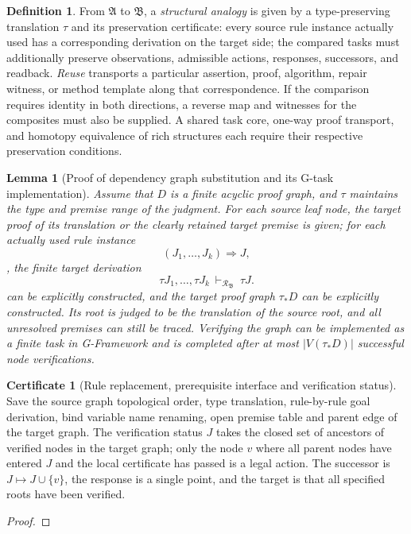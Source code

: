 \documentclass[11pt,a4paper]{article}
\theoremstyle{plain}
\newtheorem{lemma}[theorem]{Lemma}
\theoremstyle{definition}
\newtheorem{definition}[theorem]{Definition}
\newtheorem*{certificate}{Certificate}
\theoremstyle{remark}
\begin{document}
\begin{CJK*}
\begin{definition}
From $\mathfrak A$ to $\mathfrak B$, a \emph { structural analogy } is given by a type-preserving translation $\tau$ and its preservation certificate: every source rule instance actually used has a corresponding derivation on the target side; the compared tasks must additionally preserve observations, admissible actions, responses, successors, and readback. \emph { Reuse } transports a particular assertion, proof, algorithm, repair witness, or method template along that correspondence. If the comparison requires identity in both directions, a reverse map and witnesses for the composites must also be supplied. A shared task core, one-way proof transport, and homotopy equivalence of rich structures each require their respective preservation conditions.
\end{definition}

\begin{lemma}
[Proof of dependency graph substitution and its G-task implementation]\label{ar:dag-transport}
Assume that $D$ is a finite acyclic proof graph, and $\tau$ maintains the type and premise range of the judgment. For each source leaf node, the target proof of its translation or the clearly retained target premise is given; for each actually used rule instance \[
 (J_1,\ldots,J_k)\Longrightarrow J,
\], the finite target derivation \[
 \tau J_1,\ldots,\tau J_k\ \vdash_{\mathcal R_{\mathfrak B}}\ \tau J.
\] can be explicitly constructed, and the target proof graph $\tau_*D$ can be explicitly constructed. Its root is judged to be the translation of the source root, and all unresolved premises can still be traced. Verifying the graph can be implemented as a finite task in G-Framework and is completed after at most $|V(\tau_*D)|$ successful node verifications.\end{lemma}
\begin{certificate}
[Rule replacement, prerequisite interface and verification status]Save the source graph topological order, type translation, rule-by-rule goal derivation, bind variable name renaming, open premise table and parent edge of the target graph. The verification status $J$ takes the closed set of ancestors of verified nodes in the target graph; only the node $v$ where all parent nodes have entered $J$ and the local certificate has passed is a legal action. The successor is $J\mapsto J\cup\{v\}$, the response is a single point, and the target is that all specified roots have been verified.\end{certificate}
\begin{proof}

\end{proof}
\end{CJK*}
\end{document}
